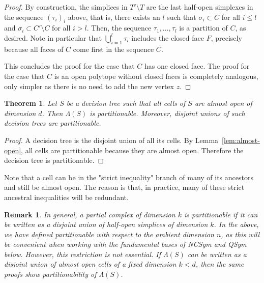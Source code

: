 \documentclass[12pt,reqno]{amsart}
\numberwithin{definition}{section}
\newtheorem{theorem}[definition]{Theorem}
\newtheorem{remark}[definition]{Remark}
\theoremstyle{definition}
\newcommand{\RR}{\mathbb{R}}
\newcommand{\allow}{\Lambda} %
\newcommand{\allowP}{\allow_{\RR^n_{> 0}}} %
\newcommand{\allowC}{\allow_{(0,1)^n}} %
\begin{document}
\begin{proof}
By construction, the simplices in $T'\setminus T$ are the last half-open simplexes in the sequence $(\tau_i)_i$ above, that is, there exists an $l$ such that $\sigma_i\subset C$ for all $i\leq l$ and $\sigma_i\subset C'\setminus C$ for all $i>l$. Then, the sequence $\tau_1,\ldots,\tau_l$ is a partition of $C$, as desired. Note in particular that $\bigcup_{i=1}^l \tau_i$ includes the closed face $F$, precisely because all faces of $C$ come first in the sequence $C$.

This concludes the proof for the case that $C$ has one closed face. The proof for the case that $C$ is an open polytope without closed faces is completely analogous, only simpler as there is no need to add the new vertex $z$.
\end{proof}

\begin{theorem}
\label{thm:decision}
Let $S$ be a decision tree such that all cells of $S$ are almost open of dimension $d$. Then $\allow(S)$ is partitionable. Moreover, disjoint unions of such decision trees are partitionable.
\end{theorem}

\begin{proof} 
A decision tree is the disjoint union of all its cells. By Lemma~\ref{lem:almost-open}, all cells are partitionable because they are almost open. Therefore the decision tree is partitionable.
\end{proof}

Note that a cell can be in the "strict inequality" branch of many of its ancestors and still be almost open. The reason is that, in practice, many of these strict ancestral inequalities will be redundant.


\begin{remark}
In general, a partial complex of dimension $k$ is partitionable if it can be written as a disjoint union of half-open simplices of dimension $k$. In the above, we have defined partitionable with respect to the ambient dimension $n$, as this will be convenient when working with the fundamental bases of NCSym and QSym below. However, this restriction is not essential. If $\allow(S)$ can be written as a disjoint union of almost open cells of a fixed dimension $k<d$, then the same proofs show partitionability of $\allow(S)$.
\end{remark}
\end{document}
